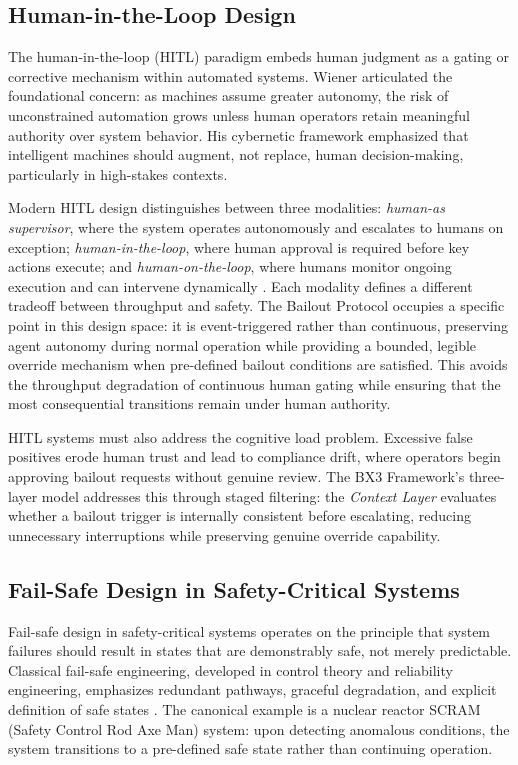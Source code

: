 \subsection{Human-in-the-Loop Design}

The human-in-the-loop (HITL) paradigm embeds human judgment as a gating or corrective mechanism within automated systems. Wiener \cite{wiener1948} articulated the foundational concern: as machines assume greater autonomy, the risk of unconstrained automation grows unless human operators retain meaningful authority over system behavior. His cybernetic framework emphasized that intelligent machines should augment, not replace, human decision-making, particularly in high-stakes contexts.

Modern HITL design distinguishes between three modalities: \textit{human-as supervisor}, where the system operates autonomously and escalates to humans on exception; \textit{human-in-the-loop}, where human approval is required before key actions execute; and \textit{human-on-the-loop}, where humans monitor ongoing execution and can intervene dynamically \cite{bansal2019}. Each modality defines a different tradeoff between throughput and safety. The Bailout Protocol occupies a specific point in this design space: it is event-triggered rather than continuous, preserving agent autonomy during normal operation while providing a bounded, legible override mechanism when pre-defined bailout conditions are satisfied. This avoids the throughput degradation of continuous human gating while ensuring that the most consequential transitions remain under human authority.

HITL systems must also address the cognitive load problem. Excessive false positives erode human trust and lead to compliance drift, where operators begin approving bailout requests without genuine review. The BX3 Framework's three-layer model addresses this through staged filtering: the \textit{Context Layer} evaluates whether a bailout trigger is internally consistent before escalating, reducing unnecessary interruptions while preserving genuine override capability.

\subsection{Fail-Safe Design in Safety-Critical Systems}

Fail-safe design in safety-critical systems operates on the principle that system failures should result in states that are demonstrably safe, not merely predictable. Classical fail-safe engineering, developed in control theory and reliability engineering, emphasizes redundant pathways, graceful degradation, and explicit definition of safe states \cite{wiener1948}. The canonical example is a nuclear reactor SCRAM (Safety Control Rod Axe Man) system: upon detecting anomalous conditions, the system transitions to a pre-defined safe state rather than continuing operation.


